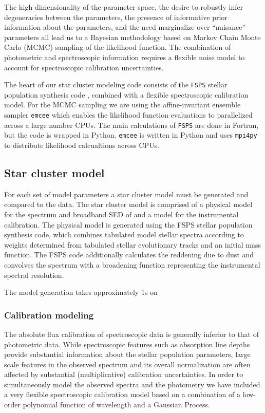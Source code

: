 \documentclass[11pt,preprint]{aastex}
\begin{document}
The high dimensionality of the parameter space, the desire to robustly
infer degeneracies between the parameters, the presence of informative
prior information about the parameters, and the need marginalize over
``nuisance'' parameters all lead us to a Bayesian methodology based on
Markov Chain Monte Carlo (MCMC) sampling of the likelihood
function. The combination of photometric and spectroscopic information
requires a flexible noise model to account for spectroscopic
calibration uncertainties.

The heart of our star cluster modeling code consists of the
\texttt{FSPS} stellar population synthesis code \citep{fsps}, combined
with a flexible spectroscopic calibration model.  For the MCMC
sampling we are using the affine-invariant ensemble sampler
\texttt{emcee} \citep{emcee} which enables the likelihood function
evaluations to parallelized across a large number CPUs. The main
calculations of \texttt{FSPS} are done in Fortran, but the code is
wrapped in Python.  \texttt{emcee} is written in Python and uses
\texttt{mpi4py} to distribute likelihood calcualtions across CPUs.

\subsection{Star cluster model}
For each set of model parameters a star cluster model must be
generated and compared to the data. The star cluster model is
comprised of a physical model for the spectrum and broadband SED of
and a model for the instrumental calibration.  The physical model is
generated using the FSPS stellar population synthesis code, which
combines tabulated model stellar spectra according to weights
determined from tabulated stellar evolutionary tracks and an initial
mass function.  The FSPS code additionally calculates the reddening
due to dust and convolves the spectrum with a broadening function
representing the instrumental spectral resolution.

The model generation takes approximately 1s on 

\subsubsection{Calibration modeling}
The absolute flux calibration of spectroscopic data is generally
inferior to that of photometric data.  While spectroscopic features
such as absorption line depths provide substantial information about
the stellar population parameters, large scale features in the
observed spectrum and its overall normalization are often affected by
substantial (multiplicative) calibration uncertainties. In order to
simultaneously model the observed spectra and the photometry we have
included a very flexible spectroscopic calibration model based on a
combination of a low-order polynomial function of wavelength and a
Gaussian Process.
\end{document}

